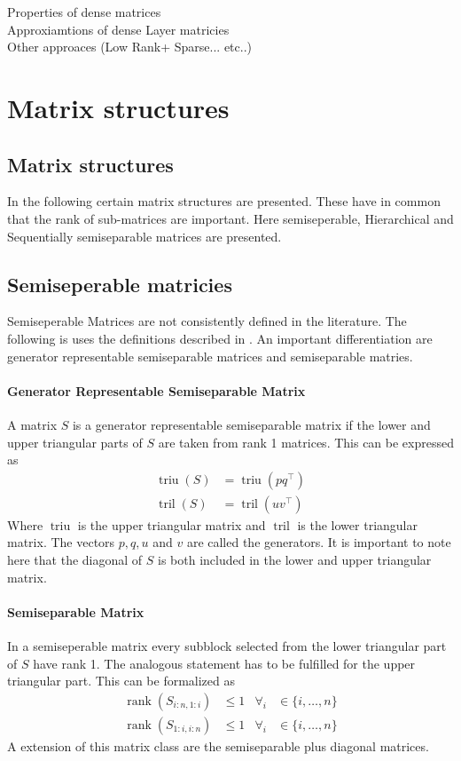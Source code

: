 \documentclass[doctype=mastersthesis,BCOR=15mm,biblatex]{ldvbook}%
\DeclareMathOperator{\rank}{rank}
\DeclareMathOperator{\triu}{triu}
\DeclareMathOperator{\tril}{tril}
\begin{document}
Properties of dense matrices\\
Approxiamtions of dense Layer matricies\\
Other approaces (Low Rank+ Sparse... etc..)

\section{Matrix structures}
\subsection{Matrix structures}
In the following certain matrix structures are presented.
These have in common that the rank of sub-matrices are important.
Here semiseperable, Hierarchical and Sequentially semiseparable matrices are presented.

\subsection{Semiseperable matricies}
Semiseperable Matrices are not consistently defined in the literature. The following is uses the definitions described in \cite{vandebril_bibliography_2005,vandebril_matrix_2007}.
An important differentiation are generator representable semiseparable matrices and semiseparable matries.
\paragraph{Generator Representable Semiseparable Matrix}
A matrix $S$ is a generator representable semiseparable matrix if the lower and upper triangular parts of $S$ are taken from rank 1 matrices.
This can be expressed as 
\begin{align}
	\triu(S) &= \triu(pq^\top)\\
	\tril(S) &= \tril(uv^\top)
\end{align}
Where $\triu$ is the upper triangular matrix and $\tril$ is the lower triangular matrix. The vectors $p,q,u$ and $v$ are called the generators.
It is important to note here that the diagonal of $S$ is both included in the lower and upper triangular matrix.

\paragraph{Semiseparable Matrix}
In a semiseperable matrix every subblock selected from the lower triangular part of $S$ have rank 1. The analogous statement has to be fulfilled for the upper triangular part.
This can be formalized as 
\begin{align}
	\rank(S_{i:n,1:i}) &\leq 1 & \forall_i &\in\{i,\dots,n\}\\
	\rank(S_{1:i,i:n}) &\leq 1 & \forall_i &\in\{i,\dots,n\}
\end{align}
A extension of this matrix class are the semiseparable plus diagonal matrices.
\end{document}

